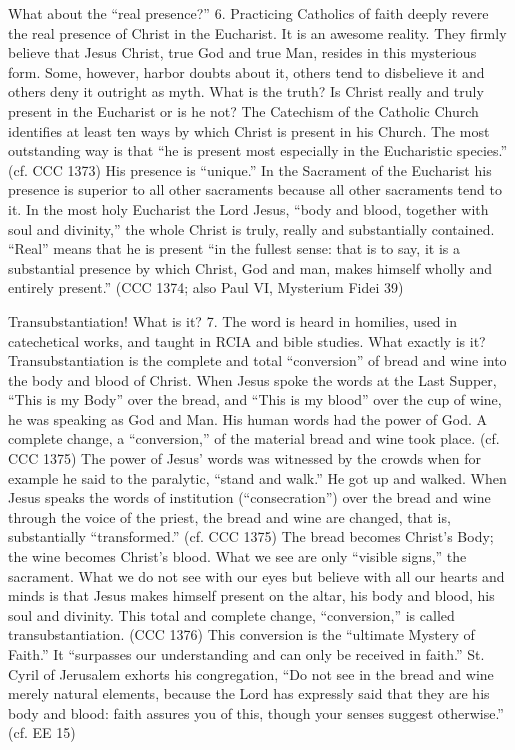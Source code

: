 \documentclass[oneside]{book}
\begin{document}
What about the ``real presence?''
6. Practicing Catholics of faith deeply revere the real presence of Christ in
the Eucharist. It is an awesome reality. They firmly believe that Jesus Christ,
true God and true Man, resides in this mysterious form. Some, however, harbor
doubts about it, others tend to disbelieve it and others deny it outright as
myth. What is the truth? Is Christ really and truly present in the Eucharist or
is he not?
The Catechism of the Catholic Church identifies at least ten ways by which
Christ is present in his Church. The most outstanding way is that ``he is
present most especially in the Eucharistic species.'' (cf. CCC 1373) His
presence is ``unique.'' In the Sacrament of the Eucharist his presence is
superior to all other sacraments because all other sacraments tend to it. In the
most holy Eucharist the Lord Jesus, ``body and blood, together with soul and
divinity,'' the whole Christ is truly, really and substantially
contained. ``Real'' means that he is present ``in the fullest sense: that is to
say, it is a substantial presence by which Christ, God and man, makes himself
wholly and entirely present.'' (CCC 1374; also Paul VI, Mysterium Fidei 39)

Transubstantiation! What is it?
7. The word is heard in homilies, used in catechetical works, and taught in RCIA
and bible studies. What exactly is it? Transubstantiation is the complete and
total ``conversion'' of bread and wine into the body and blood of Christ. When
Jesus spoke the words at the Last Supper, ``This is my Body'' over the bread,
and ``This is my blood'' over the cup of wine, he was speaking as God and
Man. His human words had the power of God. A complete change, a ``conversion,''
of the material bread and wine took place. (cf. CCC 1375) The power of Jesus'
words was witnessed by the crowds when for example he said to the paralytic,
``stand and walk.'' He got up and walked.
When Jesus speaks the words of institution (``consecration'') over the bread and
wine through the voice of the priest, the bread and wine are changed, that is,
substantially ``transformed.'' (cf. CCC 1375) The bread becomes Christ's Body;
the wine becomes Christ's blood. What we see are only ``visible signs,'' the
sacrament. What we do not see with our eyes but believe with all our hearts and
minds is that Jesus makes himself present on the altar, his body and blood, his
soul and divinity. This total and complete change, ``conversion,'' is called
transubstantiation. (CCC 1376)
This conversion is the ``ultimate Mystery of Faith.'' It ``surpasses our
understanding and can only be received in faith.'' St. Cyril of Jerusalem
exhorts his congregation, ``Do not see in the bread and wine merely natural
elements, because the Lord has expressly said that they are his body and blood:
faith assures you of this, though your senses suggest otherwise.'' (cf. EE 15)
\end{document}
